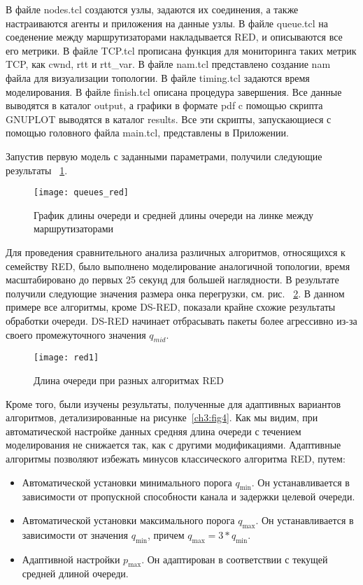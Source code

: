 В файле nodes.tcl создаются узлы, задаются их соединения, а также настраиваются агенты и приложения на данные узлы. 
В файле queue.tcl на соеденение между маршрутизаторами накладывается RED, и описываются все его метрики. В файле TCP.tcl 
прописана функция для мониторинга таких метрик TCP, как cwnd, rtt и rtt\_var. В файле nam.tcl представлено создание nam файла для 
визуализации топологии. В файле timing.tcl задаются время моделирования. В файле finish.tcl описана процедура завершения. 
Все данные выводятся в каталог output, а графики в формате pdf c помощью скрипта GNUPLOT выводятся в каталог results. 
Все эти скрипты, запускающиеся с помощью головного файла main.tcl, представлены в Приложении.

Запустив первую модель с заданными параметрами, получили следующие результаты ~\ref{ch3:fig2}.

\begin{figure}[h!]
 \centerline{\texttt{[image: queues\_red]}}
 \caption{График длины очереди и средней длины очереди на линке между маршрутизаторами}
\label{ch3:fig2}
\end{figure}


Для проведения сравнительного анализа различных алгоритмов, относящихся к семейству RED, 
было выполнено моделирование аналогичной топологии, время масштабировано до первых 25 секунд для большей наглядности. В результате получили следующие значения размера онка перегрузки, см. рис.
~\ref{ch3:fig3}. В данном примере все алгоритмы, кроме DS-RED, показали крайне
схожие результаты обработки очереди. DS-RED начинает отбрасывать пакеты более
агрессивно из-за своего промежуточного значения $q_{mid}$.

\begin{figure}[h!]
  \centering
  \texttt{[image: red1]}
  \caption{Длина очереди при разных алгоритмах RED}
  \label{ch3:fig3}
\end{figure}


Кроме того, были изучены результаты, полученные для адаптивных вариантов алгоритмов, детализированные на рисунке~\ref{ch3:fig4}. 
Как мы видим, при автоматической настройке данных средняя длина очереди с течением моделирования не снижается так, как с другими модификациями.
Адаптивные алгоритмы позволяют избежать минусов классического алгоритма RED,
путем:

\begin{itemize}

\item Автоматической установки минимального порога $q_{\min}$. Он
  устанавливается в зависимости от пропускной способности канала и задержки
    целевой очереди.

\item Автоматической установки максимального порога $q_{\max}$. Он
  устанавливается в зависимости от значения $q_{\min}$, причем $q_{\max} = 3*q_{\min}$.

\item Адаптивной настройки $p_{\max}$. Он адаптирован в соответствии с текущей
  средней длиной очереди.

\end{itemize}


